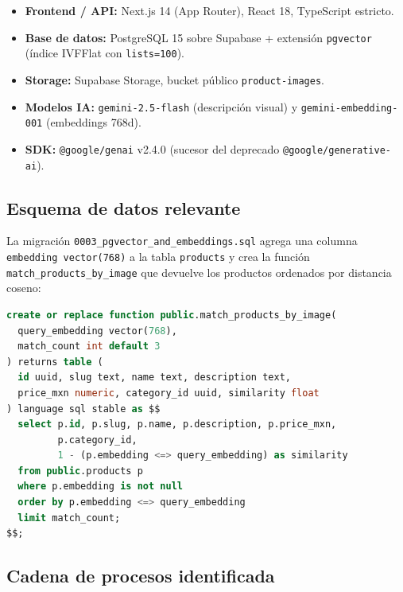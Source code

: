 \documentclass[11pt,letterpaper]{article}
\begin{document}
\begin{itemize}[leftmargin=*]
  \item \textbf{Frontend / API:} Next.js 14 (App Router), React 18, TypeScript estricto.
  \item \textbf{Base de datos:} PostgreSQL 15 sobre Supabase + extensión \texttt{pgvector} (índice IVFFlat con \texttt{lists=100}).
  \item \textbf{Storage:} Supabase Storage, bucket público \texttt{product-images}.
  \item \textbf{Modelos IA:} \texttt{gemini-2.5-flash} (descripción visual) y \texttt{gemini-embedding-001} (embeddings 768d).
  \item \textbf{SDK:} \texttt{@google/genai} v2.4.0 (sucesor del deprecado \texttt{@google/generative-ai}).
\end{itemize}

\subsection{Esquema de datos relevante}

La migración \texttt{0003\_pgvector\_and\_embeddings.sql} agrega una columna \texttt{embedding vector(768)} a la tabla \texttt{products} y crea la función \texttt{match\_products\_by\_image} que devuelve los productos ordenados por distancia coseno:

\begin{lstlisting}[language=SQL]
create or replace function public.match_products_by_image(
  query_embedding vector(768),
  match_count int default 3
) returns table (
  id uuid, slug text, name text, description text,
  price_mxn numeric, category_id uuid, similarity float
) language sql stable as $$
  select p.id, p.slug, p.name, p.description, p.price_mxn,
         p.category_id,
         1 - (p.embedding <=> query_embedding) as similarity
  from public.products p
  where p.embedding is not null
  order by p.embedding <=> query_embedding
  limit match_count;
$$;
\end{lstlisting}

\subsection{Cadena de procesos identificada}
\end{document}

